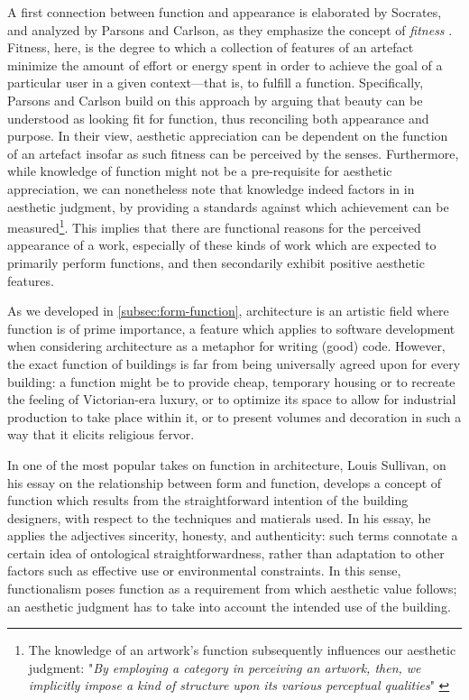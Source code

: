 A first connection between function and appearance is elaborated by Socrates, and analyzed by Parsons and Carlson, as they emphasize the concept of \emph{fitness} \citep{parsons_functional_2012}. Fitness, here, is the degree to which a collection of features of an artefact minimize the amount of effort or energy spent in order to achieve the goal of a particular user in a given context—that is, to fulfill a function. Specifically, Parsons and Carlson build on this approach by arguing that beauty can be understood as looking fit for function, thus reconciling both appearance and purpose. In their view, aesthetic appreciation can be dependent on the function of an artefact insofar as such fitness can be perceived by the senses. Furthermore, while knowledge of function might not be a pre-requisite for aesthetic appreciation, we can nonetheless note that knowledge indeed factors in in aesthetic judgment, by providing a standards against which achievement can be measured\footnote{The knowledge of an artwork's function subsequently influences our aesthetic judgment: "\emph{By employing a category in perceiving an artwork, then, we implicitly impose a kind of structure upon its various perceptual qualities}"  \citep{parsons_functional_2012}}. This implies that there are functional reasons for the perceived appearance of a work, especially of these kinds of work which are expected to primarily perform functions, and then secondarily exhibit positive aesthetic features.

As we developed in \ref{subsec:form-function}, architecture is an artistic field where function is of prime importance, a feature which applies to software development when considering architecture as a metaphor for writing (good) code. However, the exact function of buildings is far from being universally agreed upon for every building: a function might be to provide cheap, temporary housing or to recreate the feeling of Victorian-era luxury, or to optimize its space to allow for industrial production to take place within it, or to present volumes and decoration in such a way that it elicits religious fervor.

In one of the most popular takes on function in architecture, Louis Sullivan, on his essay on the relationship between form and function, develops a concept of function which results from the straightforward intention of the building designers, with respect to the techniques and matierals used. In his essay, he applies the adjectives sincerity, honesty, and authenticity: such terms connotate a certain idea of ontological straightforwardness, rather than adaptation to other factors such as effective use or environmental constraints. In this sense, functionalism poses function as a requirement from which aesthetic value follows; an aesthetic judgment has to take into account the intended use of the building.

